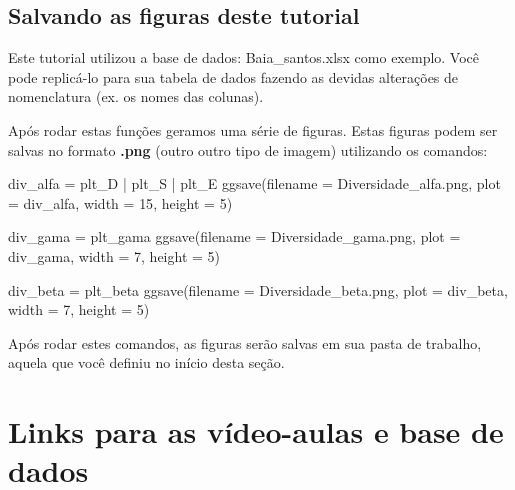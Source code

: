 \documentclass[
]{book}
\newenvironment{Shaded}{\begin{snugshade}}{\end{snugshade}}
\newcommand{\AttributeTok}[1]{\textcolor[rgb]{0.77,0.63,0.00}{#1}}
\newcommand{\DecValTok}[1]{\textcolor[rgb]{0.00,0.00,0.81}{#1}}
\newcommand{\FunctionTok}[1]{\textcolor[rgb]{0.00,0.00,0.00}{#1}}
\newcommand{\NormalTok}[1]{#1}
\newcommand{\OtherTok}[1]{\textcolor[rgb]{0.56,0.35,0.01}{#1}}
\newcommand{\SpecialCharTok}[1]{\textcolor[rgb]{0.00,0.00,0.00}{#1}}
\newcommand{\StringTok}[1]{\textcolor[rgb]{0.31,0.60,0.02}{#1}}
\begin{document}
\hypertarget{salvando-as-figuras-deste-tutorial}{%
\section{Salvando as figuras deste tutorial}\label{salvando-as-figuras-deste-tutorial}}

Este tutorial utilizou a base de dados: Baia\_santos.xlsx como exemplo. Você pode replicá-lo para sua tabela de dados fazendo as devidas alterações de nomenclatura (ex. os nomes das colunas).

Após rodar estas funções geramos uma série de figuras. Estas figuras podem ser salvas no formato \textbf{.png} (outro outro tipo de imagem) utilizando os comandos:

\begin{Shaded}
\begin{Highlighting}[]
\NormalTok{div\_alfa }\OtherTok{=}\NormalTok{ plt\_D }\SpecialCharTok{|}\NormalTok{ plt\_S }\SpecialCharTok{|}\NormalTok{ plt\_E}
\FunctionTok{ggsave}\NormalTok{(}\AttributeTok{filename =} \StringTok{\textquotesingle{}Diversidade\_alfa.png\textquotesingle{}}\NormalTok{, }
       \AttributeTok{plot =}\NormalTok{ div\_alfa, }
       \AttributeTok{width =} \DecValTok{15}\NormalTok{, }\AttributeTok{height =} \DecValTok{5}\NormalTok{)}

\NormalTok{div\_gama }\OtherTok{=}\NormalTok{ plt\_gama}
\FunctionTok{ggsave}\NormalTok{(}\AttributeTok{filename =} \StringTok{\textquotesingle{}Diversidade\_gama.png\textquotesingle{}}\NormalTok{, }
       \AttributeTok{plot =}\NormalTok{ div\_gama, }
       \AttributeTok{width =} \DecValTok{7}\NormalTok{, }\AttributeTok{height =} \DecValTok{5}\NormalTok{)}

\NormalTok{div\_beta }\OtherTok{=}\NormalTok{ plt\_beta}
\FunctionTok{ggsave}\NormalTok{(}\AttributeTok{filename =} \StringTok{\textquotesingle{}Diversidade\_beta.png\textquotesingle{}}\NormalTok{, }
       \AttributeTok{plot =}\NormalTok{ div\_beta,}
       \AttributeTok{width =} \DecValTok{7}\NormalTok{, }\AttributeTok{height =} \DecValTok{5}\NormalTok{)}
\end{Highlighting}
\end{Shaded}

Após rodar estes comandos, as figuras serão salvas em sua pasta de trabalho, aquela que você definiu no início desta seção.

\hypertarget{vedeoaulas}{%
\chapter{Links para as vídeo-aulas e base de dados}\label{vedeoaulas}}
\end{document}
